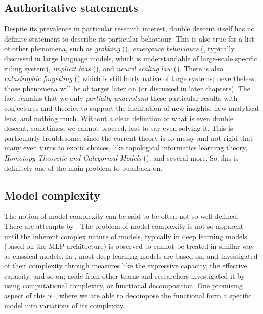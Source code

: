 \subsection{Authoritative statements}
Despite its prevalence in particular research interest, double descent itself has no definite statement to describe its particular behaviour. This is also true for a list of other phenomena, such as \textit{grokking} (\cite{power2022grokkinggeneralizationoverfittingsmall}), \textit{emergence behaviours} (\cite{wei2022emergentabilitieslargelanguage}, typically discussed in large language models, which is understandable of large-scale specific ruling system), \textit{implicit bias} (\cite{soudry2024implicitbiasgradientdescent}), and \textit{neural scaling law} (\cite{kaplan2020scalinglawsneurallanguage,wei2022emergentabilitieslargelanguage}). There is also \textit{catastrophic forgetting} (\cite{vandeven2024continuallearningcatastrophicforgetting}) which is still fairly native of large systems; nevertheless, those phenomena will be of target later on (or discussed in later chapters). The fact remains that we only \textit{partially understand} these particular results with conjectures and theories to support the facilitation of new insights, new analytical lens, and nothing much. Without a clear definition of what is even double descent, sometimes, we cannot proceed, lest to say even solving it. This is particularly troublesome, since the current theory is so messy and not rigid that many even turns to exotic choices, like topological informatics learning theory, \textit{Homotopy Theoretic and Categorical Models} (\cite{Manin_2024}), and several more. So this is definitely one of the main problem to pushback on. 

\subsection{Model complexity}
The notion of model complexity can be said to be often not so well-defined. There are attempts by \cite{hu2021modelcomplexitydeeplearning,luo2024investigatingimpactmodelcomplexity,barceló2020modelinterpretabilitylenscomputational,Molnar_2020,janik2021complexitydeepneuralnetworks}. The problem of model complexity is not so apparent until the inherent complex nature of models, typically in deep learning models (based on the MLP architecture) is observed to cannot be treated in similar way as classical models. In \cite{hu2021modelcomplexitydeeplearning}, most deep learning models are based on, and investigated of their complexity through measures like the expressive capacity, the effective capacity, and so on; aside from other teams and researchers investigated it by using computational complexity, or functional decomposition. One promising aspect of this is \cite{Molnar_2020}, where we are able to decompose the functional form a specific model into variations of its complexity. 

